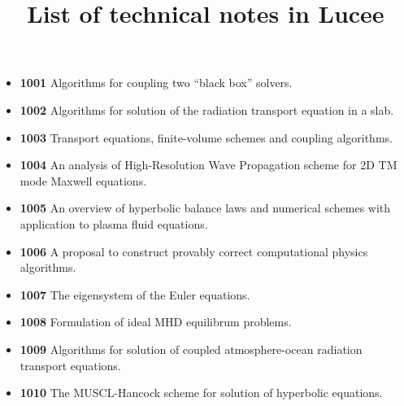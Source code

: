 \documentclass[11pt]{article}
\title{List of technical notes in Lucee}
\author{}
\date{}
\begin{document}
\maketitle

\begin{itemize}
  \item {\bf 1001} Algorithms for coupling two ``black box'' solvers.
  \item {\bf 1002} Algorithms for solution of the radiation transport
    equation in a slab.
  \item {\bf 1003} Transport equations, finite-volume schemes and
    coupling algorithms.
  \item {\bf 1004} An analysis of High-Resolution Wave Propagation
    scheme for 2D TM mode Maxwell equations.
  \item {\bf 1005} An overview of hyperbolic balance laws and
    numerical schemes with application to plasma fluid equations.
  \item {\bf 1006} A proposal to construct provably correct
    computational physics algorithms.
  \item {\bf 1007} The eigensystem of the Euler equations.
  \item {\bf 1008} Formulation of ideal MHD equilibrum problems.
  \item {\bf 1009} Algorithms for solution of coupled atmosphere-ocean
    radiation transport equations.
  \item {\bf 1010} The MUSCL-Hancock scheme for solution of hyperbolic
    equations.
\end{itemize}
\end{document}
